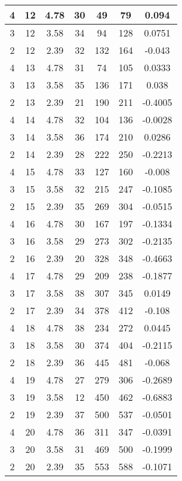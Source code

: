 \documentclass[letterpaper, 12pt]{article}
\begin{document}
\begin{longtable}{|c|c|c|c|c|c|c|}
\hline
4 & 12 & 4.78 & 30 & 49 & 79 & 0.094 \\
\hline
3 & 12 & 3.58 & 34 & 94 & 128 & 0.0751 \\
\hline
2 & 12 & 2.39 & 32 & 132 & 164 & -0.043 \\
\hline
4 & 13 & 4.78 & 31 & 74 & 105 & 0.0333 \\
\hline
3 & 13 & 3.58 & 35 & 136 & 171 & 0.038 \\
\hline
2 & 13 & 2.39 & 21 & 190 & 211 & -0.4005 \\
\hline
4 & 14 & 4.78 & 32 & 104 & 136 & -0.0028 \\
\hline
3 & 14 & 3.58 & 36 & 174 & 210 & 0.0286 \\
\hline
2 & 14 & 2.39 & 28 & 222 & 250 & -0.2213 \\
\hline
4 & 15 & 4.78 & 33 & 127 & 160 & -0.008 \\
\hline
3 & 15 & 3.58 & 32 & 215 & 247 & -0.1085 \\
\hline
2 & 15 & 2.39 & 35 & 269 & 304 & -0.0515 \\
\hline
4 & 16 & 4.78 & 30 & 167 & 197 & -0.1334 \\
\hline
3 & 16 & 3.58 & 29 & 273 & 302 & -0.2135 \\
\hline
2 & 16 & 2.39 & 20 & 328 & 348 & -0.4663 \\
\hline
4 & 17 & 4.78 & 29 & 209 & 238 & -0.1877 \\
\hline
3 & 17 & 3.58 & 38 & 307 & 345 & 0.0149 \\
\hline
2 & 17 & 2.39 & 34 & 378 & 412 & -0.108 \\
\hline
4 & 18 & 4.78 & 38 & 234 & 272 & 0.0445 \\
\hline
3 & 18 & 3.58 & 30 & 374 & 404 & -0.2115 \\
\hline
2 & 18 & 2.39 & 36 & 445 & 481 & -0.068 \\
\hline
4 & 19 & 4.78 & 27 & 279 & 306 & -0.2689 \\
\hline
3 & 19 & 3.58 & 12 & 450 & 462 & -0.6883 \\
\hline
2 & 19 & 2.39 & 37 & 500 & 537 & -0.0501 \\
\hline
4 & 20 & 4.78 & 36 & 311 & 347 & -0.0391 \\
\hline
3 & 20 & 3.58 & 31 & 469 & 500 & -0.1999 \\
\hline
2 & 20 & 2.39 & 35 & 553 & 588 & -0.1071 \\
\hline
\end{longtable}
\end{document}

